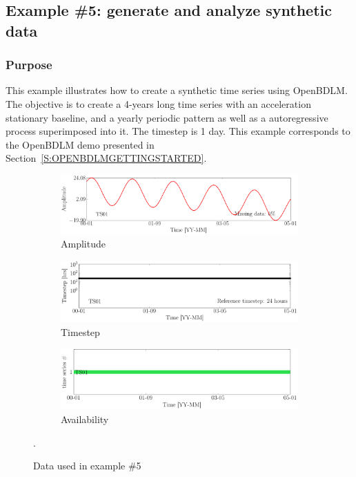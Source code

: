 \subsection{Example \#5: generate and analyze synthetic data }
\label{S:EXAMPLESYNTHETICDATA}


\subsubsection{Purpose}
This example illustrates how to create a synthetic time series using OpenBDLM.
The objective is to create a 4-years long time series with an acceleration stationary baseline, and a yearly periodic pattern as well as a autoregressive process superimposed into it. 
The timestep is 1 day.
This example corresponds to the OpenBDLM demo presented in Section~\ref{S:OPENBDLMGETTINGSTARTED}.

\begin{figure}[h!]
\centering
\begin{subfigure}{\linewidth}
\includegraphics[width=0.9\linewidth]{./docfigs/Example_SYNTHETIC/raw/ALL_AMPLITUDES.pdf} 
\caption{Amplitude}
\end{subfigure}
\begin{subfigure}{\linewidth}
\includegraphics[width=0.9\linewidth]{./docfigs/Example_SYNTHETIC/raw/ALL_TIMESTEPS.pdf}
\caption{Timestep}
\end{subfigure}
\begin{subfigure}{\linewidth}
\includegraphics[width=0.9\linewidth]{./docfigs/Example_SYNTHETIC/raw/AVAILABILITY.pdf}
\caption{Availability}
\end{subfigure}
\caption{Data used in example \#5}.
\label{fig:DataSummaryRawSynthetic}
\end{figure}


